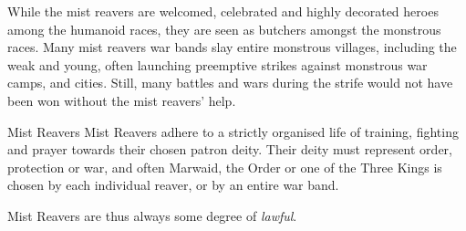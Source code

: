 While the mist reavers are welcomed, celebrated and highly decorated heroes
among the humanoid races, they are seen as butchers amongst the monstrous
races. Many mist reavers war bands slay entire monstrous villages, including
the weak and young, often launching preemptive strikes against monstrous
war camps, and cities. Still, many battles and wars during the strife would
not have been won without the mist reavers' help.

\begin{35e}{Mist Reavers}
  Mist Reavers adhere to a strictly organised life of training, fighting and
  prayer towards their chosen patron deity. Their deity must represent order,
  protection or war, and often Marwaid, the Order or one of the Three Kings is
  chosen by each individual reaver, or by an entire war band.

  Mist Reavers are thus always some degree of \emph{lawful}.
\end{35e}
